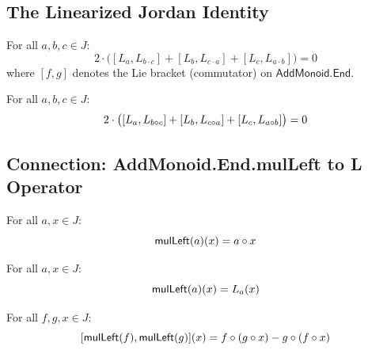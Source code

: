 \subsection{The Linearized Jordan Identity}

\begin{theorem}
For all $a, b, c \in J$:
\[ 2 \cdot \bigl( [L_a, L_{b \cdot c}] + [L_b, L_{c \cdot a}] + [L_c, L_{a \cdot b}] \bigr) = 0 \]
where $[f, g]$ denotes the Lie bracket (commutator) on $\mathsf{AddMonoid.End}$.
\end{theorem}

\begin{theorem}
For all $a, b, c \in J$:
\[ 2 \cdot \bigl( [L_a, L_{b \circ c}] + [L_b, L_{c \circ a}] + [L_c, L_{a \circ b}] \bigr) = 0 \]
\end{theorem}

\subsection{Connection: AddMonoid.End.mulLeft to L Operator}

\begin{lemma}
For all $a, x \in J$:
\[ \mathsf{mulLeft}(a)(x) = a \circ x \]
\end{lemma}

\begin{lemma}
For all $a, x \in J$:
\[ \mathsf{mulLeft}(a)(x) = L_{a}(x) \]
\end{lemma}

\begin{lemma}
For all $f, g, x \in J$:
\[ [\mathsf{mulLeft}(f), \mathsf{mulLeft}(g)](x) = f \circ (g \circ x) - g \circ (f \circ x) \]
\end{lemma}
